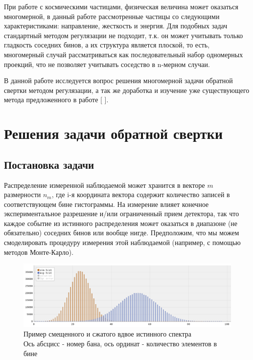 \documentclass[a4paper,12pt]{diplom}
\begin{document}
При работе с космическими частицами, физическая величина может оказаться многомерной, в данный работе  рассмотренные частицы со следующими
характеристиками: направление, жесткость и энергия. Для подобных задач стандартный методом регулязации не подходит, т.к. он может учитывать
только гладкость соседних бинов, а их структура является плоской, то есть, многомерный случай рассматриваться как последовательный набор
одномерных проекций, что не позволяет учитывать соседство в n-мерном случаи.

В данной работе исследуется вопрос решения многомерной задачи обратной свертки методом регулязации, а так же доработка и изучение уже
существующего метода предложенного в работе [ ].



\chapter{Решения задачи обратной свертки}
\section{Постановка задачи}

Распределение измеренной наблюдаемой может хранится в векторе $m$ размерности $n_{m}$, где i-я координата вектора содержит количество записей 
в соответствующем бине гистограммы. На измерение влияет конечное экспериментальное разрешение и/или ограниченный прием детектора,  
так что каждое событие из истинного распределения может оказаться в диапазоне (не обязательно) соседних бинов или вообще нигде.  
Предположим, что мы можем смоделировать процедуру измерения этой наблюдаемой (например, с помощью методов Монте-Карло). 

\begin{figure}[h]
   \includegraphics[width=\linewidth]{images/gaus_dist2.png}
   \caption{Пример смещенного и сжатого вдвое истинного спектра \\
   Ось абсцисс - номер бана, ось ординат - количество элементов в бине }
   \label{photo:gaus_dist}
 \end{figure}
\end{document}
